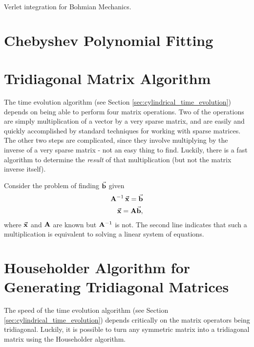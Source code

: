 \documentclass[12pt]{article}
\numberwithin{equation}{section}
\begin{document}
Verlet integration for Bohmian Mechanics.



\appendix

\newpage
\section{Chebyshev Polynomial Fitting}\label{app:chebyshev_fitting}




\newpage
\section{Tridiagonal Matrix Algorithm}\label{app:tridiagonal_matrix_algorithm}
The time evolution algorithm (see Section \ref{sec:cylindrical_time_evolution}) depends on being able to perform four matrix operations. Two of the operations are simply multiplication of a vector by a very sparse matrix, and are easily and quickly accomplished by standard techniques for working with sparse matrices. The other two steps are complicated, since they involve multiplying by the inverse of a very sparse matrix - not an easy thing to find. Luckily, there is a fast algorithm to determine the \emph{result} of that multiplication (but not the matrix inverse itself).

Consider the problem of finding $\va{b}$ given
\begin{align*}
\vb{A}^{-1} \, \va{x} = \va{b} \\
\va{x} = \vb{A} \va{b},
\end{align*}
where $\va{x}$ and $\vb{A}$ are known but $\vb{A}^{-1}$ is not. The second line indicates that such a multiplication is equivalent to solving a linear system of equations.




\newpage
\section{Householder Algorithm for Generating Tridiagonal Matrices}\label{app:householder}
The speed of the time evolution algorithm (see Section \ref{sec:cylindrical_time_evolution}) depends critically on the matrix operators being tridiagonal. Luckily, it is possible to turn any symmetric matrix into a tridiagonal matrix using the Householder algorithm.

\end{document}
